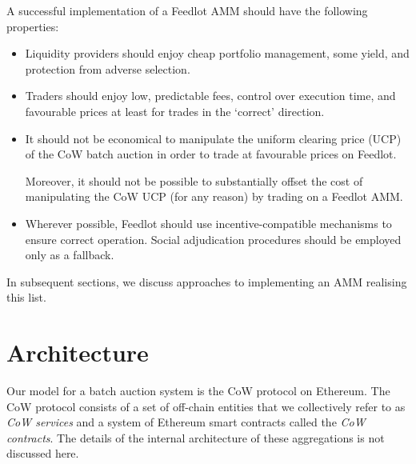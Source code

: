 \documentclass[a4paper,10pt]{article}
\theoremstyle{remark}
\begin{document}
A successful implementation of a Feedlot AMM should have the following properties:
\begin{itemize}
  \item
    Liquidity providers should enjoy cheap portfolio management, some yield, and protection from adverse selection.
    
  \item
    Traders should enjoy low, predictable fees, control over execution time, and favourable prices at least for trades in the `correct' direction.
    
  \item
    It should not be economical to manipulate the uniform clearing price (UCP) of the CoW batch auction in order to trade at favourable prices on Feedlot.
    
    Moreover, it should not be possible to substantially offset the cost of manipulating the CoW UCP (for any reason) by trading on a Feedlot AMM.

  \item 
    Wherever possible, Feedlot should use incentive-compatible mechanisms to ensure correct operation.
    Social adjudication procedures should be employed only as a fallback.
  
\end{itemize}
%
In subsequent sections, we discuss approaches to implementing an AMM realising this list.


\section{Architecture}
\label{architecture}

Our model for a batch auction system is the CoW protocol on Ethereum.
%
The CoW protocol consists of a set of off-chain entities that we collectively refer to as \emph{CoW services} and a system of Ethereum smart contracts called the \emph{CoW contracts}. The details of the internal architecture of these aggregations is not discussed here.
\end{document}
